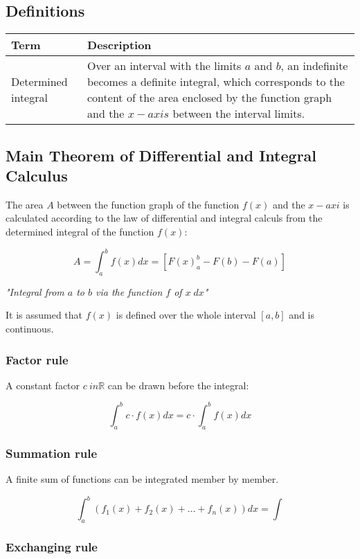 \documentclass{book}
\begin{document}
\subsection{Definitions}

\begin{tabular}{p{3cm}p{10.5cm}}
  \toprule
  \textbf{Term} & \textbf{Description} \\
  \midrule
  Determined integral & Over an interval with the limits $a$ and $b$, an indefinite becomes a definite integral, which corresponds to the content of the area enclosed by the function graph and the $x-axis$ between the interval limits.\\
  \bottomrule
\end{tabular}

\subsection{Main Theorem of Differential and Integral Calculus}

The area $A$ between the function graph of the function $f(x)$ and the $x-axi$ is calculated according to the law of differential and integral calculs from the determined integral of the function $f(x)$:

\[
  A = \int_a^b f(x)dx = [F(x)_a^b-F(b)-F(a)]
\]

\textit{"Integral from $a$ to $b$ via the function $f$ of $x\; dx$"}

It is assumed that $f(x)$ is defined over the whole interval $[a,b]$ and is continuous.

\subsubsection{Factor rule}
A constant factor  $c \ in \mathbb{R}$ can be drawn before the integral:

\[
  \int_a^b c \cdot f(x)dx = c \cdot \int_a^b f(x) dx
\]

\subsubsection{Summation rule}
A finite sum of functions can be integrated member by member.

\[
  \int_a^b (f_1(x) + f_2(x) + \dots +f_n(x))dx = \int 
\]

\subsubsection{Exchanging rule}
\end{document}
